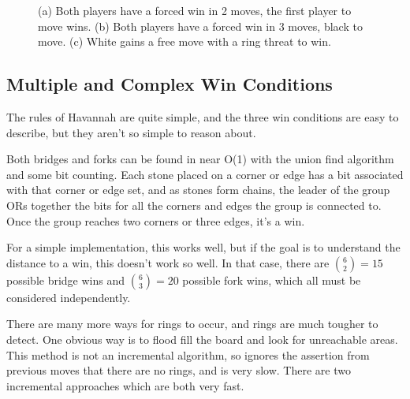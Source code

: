 \begin{figure}
	\centering
	\caption{(a) Both players have a forced win in 2 moves, the first player to move wins. (b) Both players have a forced win in 3 moves, black to move. (c) White gains a free move with a ring threat to win.}
	\label{fig:race}
\end{figure}



\subsection{Multiple and Complex Win Conditions}

The rules of Havannah are quite simple, and the three win conditions are easy to describe, but they aren't so simple to reason about.

Both bridges and forks can be found in near O(1) with the union find algorithm and some bit counting. Each stone placed on a corner or edge has a bit associated with that corner or edge set, and as stones form chains, the leader of the group ORs together the bits for all the corners and edges the group is connected to. Once the group reaches two corners or three edges, it's a win.

For a simple implementation, this works well, but if the goal is to understand the distance to a win, this doesn't work so well. In that case, there are ${6 \choose 2} = 15$ possible bridge wins and ${6 \choose 3} = 20$ possible fork wins, which all must be considered independently.

There are many more ways for rings to occur, and rings are much tougher to detect. One obvious way is to flood fill the board and look for unreachable areas. This method is not an incremental algorithm, so ignores the assertion from previous moves that there are no rings, and is very slow. There are two incremental approaches which are both very fast.

